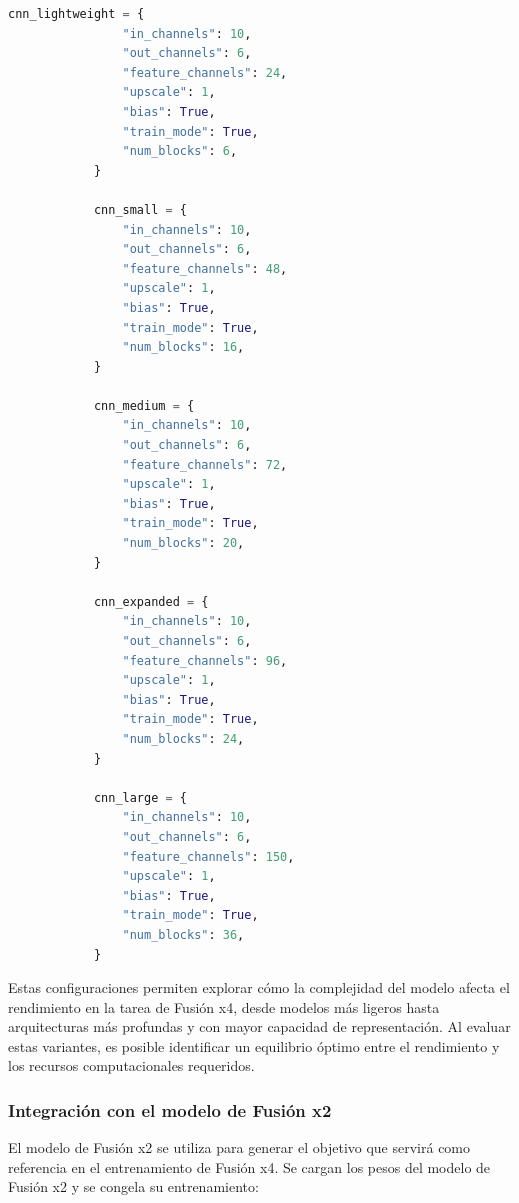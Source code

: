             \begin{lstlisting}[language=Python]
            cnn_lightweight = {
                "in_channels": 10,
                "out_channels": 6,
                "feature_channels": 24,
                "upscale": 1,
                "bias": True,
                "train_mode": True,
                "num_blocks": 6,
            }

            cnn_small = {
                "in_channels": 10,
                "out_channels": 6,
                "feature_channels": 48,
                "upscale": 1,
                "bias": True,
                "train_mode": True,
                "num_blocks": 16,
            }

            cnn_medium = {
                "in_channels": 10,
                "out_channels": 6,
                "feature_channels": 72,
                "upscale": 1,
                "bias": True,
                "train_mode": True,
                "num_blocks": 20,
            }

            cnn_expanded = {
                "in_channels": 10,
                "out_channels": 6,
                "feature_channels": 96,
                "upscale": 1,
                "bias": True,
                "train_mode": True,
                "num_blocks": 24,
            }

            cnn_large = {
                "in_channels": 10,
                "out_channels": 6,
                "feature_channels": 150,
                "upscale": 1,
                "bias": True,
                "train_mode": True,
                "num_blocks": 36,
            }
            \end{lstlisting}

            Estas configuraciones permiten explorar cómo la complejidad del modelo afecta el rendimiento en la tarea de Fusión x4, desde modelos más ligeros hasta arquitecturas más profundas y con mayor capacidad de representación. Al evaluar estas variantes, es posible identificar un equilibrio óptimo entre el rendimiento y los recursos computacionales requeridos.

        \subsubsection{Integración con el modelo de Fusión x2}

            El modelo de Fusión x2 se utiliza para generar el objetivo que servirá como referencia en el entrenamiento de Fusión x4. Se cargan los pesos del modelo de Fusión x2 y se congela su entrenamiento:

